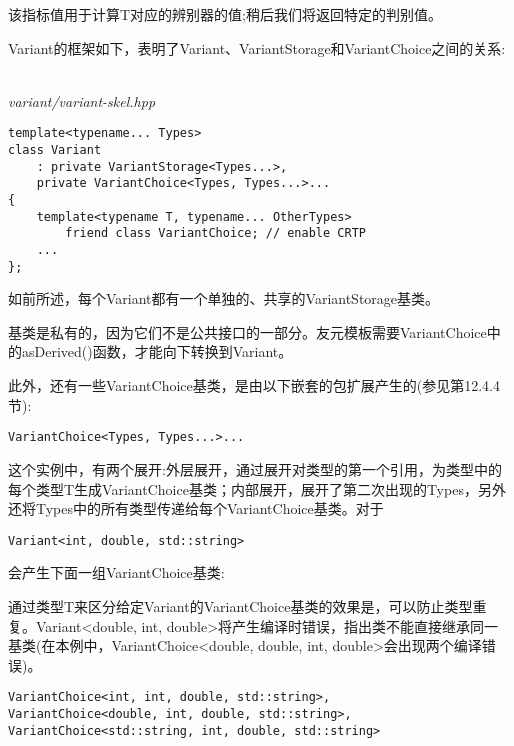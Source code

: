 该指标值用于计算T对应的辨别器的值;稍后我们将返回特定的判别值。

Variant的框架如下，表明了Variant、VariantStorage和VariantChoice之间的关系:

\hspace*{\fill} \\ %
\noindent
\textit{variant/variant-skel.hpp}
\begin{lstlisting}[style=styleCXX]
template<typename... Types>
class Variant
	: private VariantStorage<Types...>,
	private VariantChoice<Types, Types...>...
{
	template<typename T, typename... OtherTypes>
		friend class VariantChoice; // enable CRTP
	...
};
\end{lstlisting}

如前所述，每个Variant都有一个单独的、共享的VariantStorage基类。

\begin{tcolorbox}[colback=webgreen!5!white,colframe=webgreen!75!black]
\hspace*{0.75cm}基类是私有的，因为它们不是公共接口的一部分。友元模板需要VariantChoice中的asDerived()函数，才能向下转换到Variant。
\end{tcolorbox}

此外，还有一些VariantChoice基类，是由以下嵌套的包扩展产生的(参见第12.4.4节):

\begin{lstlisting}[style=styleCXX]
VariantChoice<Types, Types...>...
\end{lstlisting}

这个实例中，有两个展开:外层展开，通过展开对类型的第一个引用，为类型中的每个类型T生成VariantChoice基类；内部展开，展开了第二次出现的Types，另外还将Types中的所有类型传递给每个VariantChoice基类。对于

\begin{lstlisting}[style=styleCXX]
Variant<int, double, std::string>
\end{lstlisting}

会产生下面一组VariantChoice基类:

\begin{tcolorbox}[colback=webgreen!5!white,colframe=webgreen!75!black]
\hspace*{0.75cm}通过类型T来区分给定Variant的VariantChoice基类的效果是，可以防止类型重复。Variant<double, int, double>将产生编译时错误，指出类不能直接继承同一基类(在本例中，VariantChoice<double, double, int, double>会出现两个编译错误)。
\end{tcolorbox}

\begin{lstlisting}[style=styleCXX]
VariantChoice<int, int, double, std::string>,
VariantChoice<double, int, double, std::string>,
VariantChoice<std::string, int, double, std::string>
\end{lstlisting}


